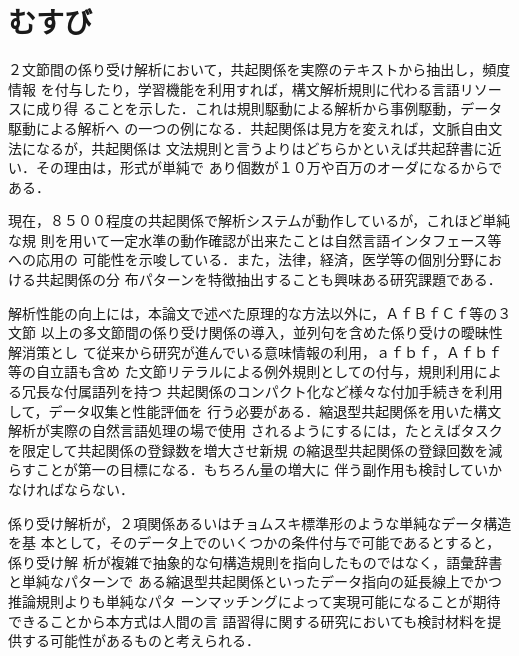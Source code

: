 \section{むすび}

２文節間の係り受け解析において，共起関係を実際のテキストから抽出し，頻度情報
を付与したり，学習機能を利用すれば，構文解析規則に代わる言語リソースに成り得
ることを示した．これは規則駆動による解析から事例駆動，データ駆動による解析へ
の一つの例になる．共起関係は見方を変えれば，文脈自由文法になるが，共起関係は
文法規則と言うよりはどちらかといえば共起辞書に近い．その理由は，形式が単純で
あり個数が１０万や百万のオーダになるからである．

現在，８５００程度の共起関係で解析システムが動作しているが，これほど単純な規
則を用いて一定水準の動作確認が出来たことは自然言語インタフェース等への応用の
可能性を示唆している．また，法律，経済，医学等の個別分野における共起関係の分
布パターンを特徴抽出することも興味ある研究課題である．

解析性能の向上には，本論文で述べた原理的な方法以外に，ＡｆＢｆＣｆ等の３文節
以上の多文節間の係り受け関係の導入，並列句を含めた係り受けの曖昧性解消策とし
て従来から研究が進んでいる意味情報の利用，ａｆｂｆ，Ａｆｂｆ等の自立語も含め
た文節リテラルによる例外規則としての付与，規則利用による冗長な付属語列を持つ
共起関係のコンパクト化など様々な付加手続きを利用して，データ収集と性能評価を
行う必要がある．縮退型共起関係を用いた構文解析が実際の自然言語処理の場で使用
されるようにするには，たとえばタスクを限定して共起関係の登録数を増大させ新規
の縮退型共起関係の登録回数を減らすことが第一の目標になる．もちろん量の増大に
伴う副作用も検討していかなければならない．

係り受け解析が，２項関係あるいはチョムスキ標準形のような単純なデータ構造を基
本として，そのデータ上でのいくつかの条件付与で可能であるとすると，係り受け解
析が複雑で抽象的な句構造規則を指向したものではなく，語彙辞書と単純なパターンで
ある縮退型共起関係といったデータ指向の延長線上でかつ推論規則よりも単純なパタ
ーンマッチングによって実現可能になることが期待できることから本方式は人間の言
語習得に関する研究においても検討材料を提供する可能性があるものと考えられる．





















